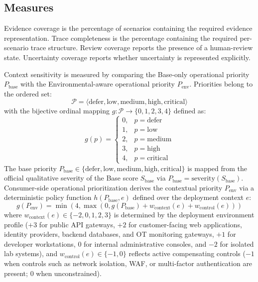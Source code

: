 \documentclass[conference]{IEEEtran}
\begin{document}
\subsection{Measures}

Evidence coverage is the percentage of scenarios containing the required
evidence representation. Trace completeness is the percentage containing the
required per-scenario trace structure. Review coverage reports the presence of
a human-review state. Uncertainty coverage reports whether uncertainty is
represented explicitly.

Context sensitivity is measured by comparing the Base-only operational priority
$P_{\text{base}}$ with the Environmental-aware operational priority $P_{\text{env}}$.
Priorities belong to the ordered set:
\begin{equation}
\mathcal{P} = \langle \text{defer}, \text{low}, \text{medium}, \text{high}, \text{critical} \rangle
\end{equation}
with the bijective ordinal mapping $g: \mathcal{P} \to \{0, 1, 2, 3, 4\}$ defined as:
\begin{equation}
g(p) = \begin{cases}
0, & p = \text{defer} \\
1, & p = \text{low} \\
2, & p = \text{medium} \\
3, & p = \text{high} \\
4, & p = \text{critical}
\end{cases}
\end{equation}
The base priority $P_{\text{base}} \in \{\text{defer}, \text{low}, \text{medium}, \text{high}, \text{critical}\}$ is mapped from the official qualitative severity of the Base score $S_{\text{base}}$ via $P_{\text{base}} = \text{severity}(S_{\text{base}})$. Consumer-side operational prioritization derives the contextual priority $P_{\text{env}}$ via a deterministic policy function $h(P_{\text{base}}, e)$ defined over the deployment context $e$:
\begin{equation}
g(P_{\text{env}}) = \min(4, \max(0, g(P_{\text{base}}) + w_{\text{context}}(e) + w_{\text{control}}(e)))
\end{equation}
where $w_{\text{context}}(e) \in \{-2, 0, 1, 2, 3\}$ is determined by the deployment environment profile ($+3$ for public API gateways, $+2$ for customer-facing web applications, identity providers, backend databases, and OT monitoring gateways, $+1$ for developer workstations, $0$ for internal administrative consoles, and $-2$ for isolated lab systems), and $w_{\text{control}}(e) \in \{-1, 0\}$ reflects active compensating controls ($-1$ when controls such as network isolation, WAF, or multi-factor authentication are present; $0$ when unconstrained).
\end{document}
